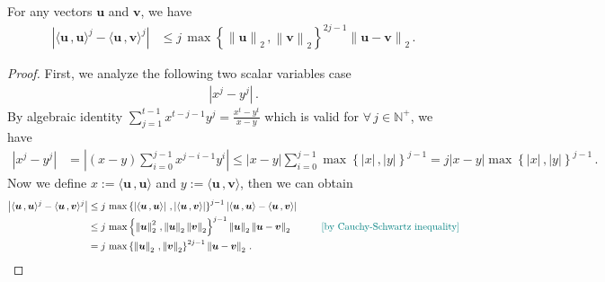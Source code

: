 \begin{lemma}\label{vec-ineq}
For any vectors $\bm u$ and $\bm v$, we have
    \begin{align*}
        \left|\langle \bm u\,, \bm u \rangle^j - \langle \bm u\,, \bm v \rangle^j\right| & \leq j\,\max\left\{\left\|\bm u\right\|_2\,,\left\|\bm v\right\|_2\right\}^{2j-1} \left\|\bm u - \bm v\right\|_2\,.
    \end{align*}
\end{lemma}
\begin{proof}
    First, we analyze the following two scalar variables case
    \begin{align*}
        \left|x^j-y^j\right|\,.
    \end{align*}
    By algebraic identity $\sum_{j=1}^{t-1}x^{t-j-1}y^j=\frac{x^t-y^t}{x-y}$ which is valid for $\forall\,j\in\mathbb{N}^+$, we have
    \begin{align*}
        \left|x^j-y^j\right|&=\left|(x-y)\sum_{i=0}^{j-1}x^{j-i-1}y^i\right|
        \leq |x-y|\sum_{i=0}^{j-1}\max\left\{|x|\,,|y|\right\}^{j-1}
        = j|x-y|\max\left\{|x|\,,|y|\right\}^{j-1}\,.
    \end{align*}
    Now we define $x:=\langle \bm u\,, \bm u \rangle$ and $y:=\langle \bm u\,, \bm v \rangle$, then we can obtain
    \begin{align*}
        \left|\langle \bm u\,, \bm u \rangle^j - \langle \bm u\,, \bm v \rangle^j\right| & \leq j\,\max\left\{\left|\langle \bm u\,, \bm u \rangle\right|\,,\left|\langle \bm u\,, \bm v \rangle\right|\right\}^{j-1}\left|\langle \bm u\,, \bm u \rangle - \langle \bm u\,, \bm v \rangle\right|\\
        & \leq j\,\max\left\{\left\|\bm u\right\|_2^2\,,\left\|\bm u\right\|_2 \left\|\bm v\right\|_2\right\}^{j-1}\left\|\bm u\right\|_2 \left\|\bm u - \bm v\right\|_2\quad \tag*{\color{teal}[by Cauchy-Schwartz inequality]}\\
        & = j\,\max\left\{\left\|\bm u\right\|_2\,,\left\|\bm v\right\|_2\right\}^{2j-1} \left\|\bm u - \bm v\right\|_2\,.
    \end{align*}
\end{proof}
